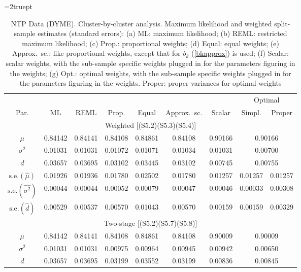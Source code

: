 \documentclass[11pt,a5paper,twoside]{book}
\begin{document}
\begin{table}[!t]
\begin{center}
\caption[Cluster-by-cluster analysis, DYME]{ \linespread{1}\small NTP Data (DYME). Cluster-by-cluster analysis. Maximum likelihood and weighted split-sample estimates (standard errors): (a) ML: maximum likelihood; (b) REML: restricted maximum likelihood; (c) Prop.: proportional weights; (d) Equal: equal weights; (e) Approx.~sc.: like proportional weights, except that for $b_k$ (\ref{bkapprox}) is used; (f) Scalar: scalar weights, with the sub-sample specific weights plugged in for the parameters figuring in the weights; (g) Opt.: optimal weights, with the sub-sample specific weights plugged in for the parameters figuring in the weights. Proper: proper variances for optimal weights \label{ntpestimatestable6}}


\vspace*{2mm}

\def\arraystretch{0.6}\small\tabcolsep=2truept \begin{tabular}{ccccccccc}
\hline\hline
     &   &     &      &             &         &      & \multicolumn{2}{c}{Optimal}\\
\cline{8-9}
 Par.& ML& REML& Prop.& Equal       & Approx.~sc.&Scalar& Simpl. & Proper\\
\hline
\hline
\multicolumn{9}{c}{{Weighted [(S5.2)(S5.3)(S5.4)]}}\\
\hline
$\mu$ & 0.84142 & 0.84141 & 0.84108 & 0.84861 & 0.84108 & 0.90166 & \multicolumn{2}{c}{0.90166}  \\
$\sigma^2$ & 0.01031 & 0.01031 & 0.01072 & 0.01071 & 0.01034 & 0.01031 & \multicolumn{2}{c}{0.00700}  \\
$d$ & 0.03657 & 0.03695 & 0.03102 & 0.03445 & 0.03102 & 0.00745 & \multicolumn{2}{c}{0.00755}  \\
\hline
$\mbox{s.e.}(\widehat{\mu})$ & 0.01926 & 0.01936 & 0.01780 & 0.02502 & 0.01780 & 0.01257 & 0.01257 & 0.01257 \\
$\mbox{s.e.}(\widehat{\sigma^2})$ & 0.00044 & 0.00044 & 0.00052 & 0.00079 & 0.00047 & 0.00046 & 0.00033 & 0.00308 \\
  $\mbox{s.e.}(\widehat{d})$ & 0.00529 & 0.00537 & 0.00570 & 0.01043 & 0.00570 & 0.00159 & 0.00159 & 0.00329 \\
\hline
\hline
\multicolumn{9}{c}{{Two-stage [(S5.2)(S5.7)(S5.8)]}}\\
\hline
$\mu$ & 0.84142 & 0.84141 & 0.84108 & 0.84861 & 0.84108 & 0.90009 & \multicolumn{2}{c}{0.90009}  \\
  $\sigma^2$ & 0.01031 & 0.01031 & 0.00975 & 0.00964 & 0.00945 & 0.00942 & \multicolumn{2}{c}{0.00650}  \\
$d$ & 0.03657 & 0.03695 & 0.03199 & 0.03552 & 0.03199 & 0.00836 & \multicolumn{2}{c}{0.00845}  \\


\end{tabular}
\end{center}
\end{table}
\end{document}

